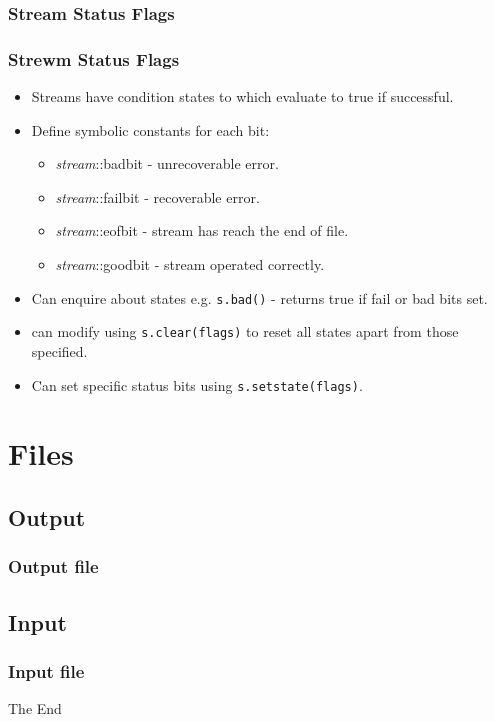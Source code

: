 \documentclass{beamer}
\begin{document}
\subsubsection{Stream Status Flags}
\begin{frame}
\frametitle{Strewm Status Flags}
\begin{itemize}
\item Streams have condition states to which evaluate to true if successful.
\item Define symbolic constants for each bit:
\begin{itemize}
\item \textit{stream}::badbit - unrecoverable error.
\item \textit{stream}::failbit - recoverable error.
\item \textit{stream}::eofbit - stream has reach the end of file.
\item \textit{stream}::goodbit - stream operated correctly.
\end{itemize}
\item Can enquire about states e.g. \texttt{s.bad()} - returns true if fail or bad bits set.
\item can modify using \texttt{s.clear(flags)} to reset all states apart from those specified.
\item Can set specific status bits using \texttt{s.setstate(flags)}.
\end{itemize}
\end{frame}
\section{Files}
\subsection{Output}
\begin{frame}
\frametitle{Output file}
\fout
\end{frame}

\subsection{Input}
\begin{frame}
\frametitle{Input file}
\fin
\end{frame}


\begin{frame} 
\Huge{\centerline{The End}}
\end{frame}
\end{document}
